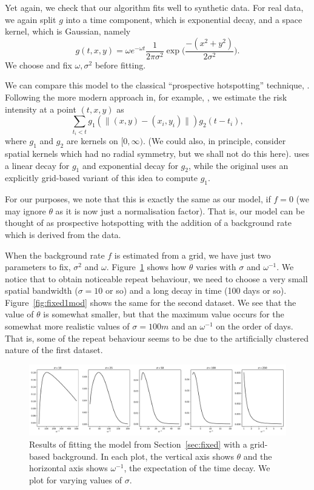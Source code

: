 \documentclass[twoside,a4paper]{article}
\theoremstyle{plain}
\theoremstyle{definition}
\begin{document}
Yet again, we check that our algorithm fits well to synthetic data.  For real data, we again
split $g$ into a time component, which is exponential decay, and a space kernel, which is
Gaussian, namely
\[ g(t,x,y) = \omega e^{-\omega t} \frac{1}{2\pi\sigma^2}
\exp\Big( \frac{-(x^2+y^2)}{2\sigma^2} \Big). \]
We choose and fix $\omega, \sigma^2$ before fitting.

We can compare this model to the classical ``prospective hotspotting'' technique,
\cite{bjp}.  Following the more modern approach in, for example, \cite{rdbjc},
we estimate the risk intensity at a point $(t,x,y)$ as
\[ \sum_{t_i<t} g_1(\|(x,y) - (x_i,y_i)\|) g_2(t-t_i), \]
where $g_1$ and $g_2$ are kernels on $[0,\infty)$.  (We could also, in principle, consider
spatial kernels which had no radial symmetry, but we shall not do this here).
\cite{rdbjc} uses a linear decay
for $g_1$ and exponential decay for $g_2$, while the original \cite{bjp} uses an explicitly
grid-based variant of this idea to compute $g_1$.

For our purposes, we note that this is exactly the same as our model, if $f=0$ (we may ignore
$\theta$ as it is now just a normalisation factor).  That is, our model can be thought of
as prospective hotspotting with the addition of a background rate which is derived from the data.

When the background rate $f$ is estimated from a grid, we have just two parameters to fix,
$\sigma^2$ and $\omega$.  Figure~\ref{fig:fixed1} shows how $\theta$ varies with $\sigma$
and $\omega^{-1}$.  We notice that to obtain noticeable repeat behaviour, we need to choose
a very small spatial bandwidth ($\sigma=10$ or so) and a long decay in time (100 days or so).
Figure~\ref{fig:fixed1mod} shows the same for the second dataset.  We see that the value of
$\theta$ is somewhat smaller, but that the maximum value occurs for the somewhat more
realistic values of $\sigma=100m$ and an $\omega^{-1}$ on the order of days.  That is,
some of the repeat behaviour seems to be due to the artificially clustered nature of
the first dataset.

\begin{figure}
  \includegraphics[width=\textwidth]{../notebooks/fixed_grid_1.pdf}
  \caption{Results of fitting the model from Section~\ref{sec:fixed} with a grid-based
  background.  In each plot, the vertical axis shows $\theta$ and the horizontal axis shows
  $\omega^{-1}$, the expectation of the time decay.  We plot for varying values of $\sigma$.}
  \label{fig:fixed1}
\end{figure}
\end{document}
